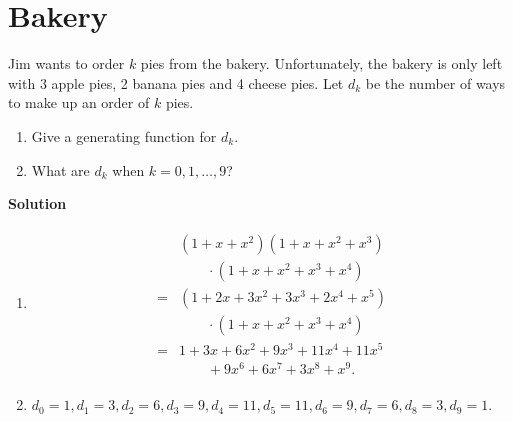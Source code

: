 \documentclass{../../cls/sig-alternate-05-2015}
\begin{document}
\section{Bakery}
Jim wants to order $k$ pies from the bakery.
Unfortunately,
the bakery is only left with 3 apple pies,
2 banana pies and 4 cheese pies.
Let $d_k$ be the number of ways
to make up an order of $k$ pies.
\begin{enumerate}
    \item Give a generating function for $d_k$.
    \item What are $d_k$ when $k = 0, 1, \ldots, 9$?
\end{enumerate}
\textbf{Solution} \begin{enumerate}
    \item \begin{align}
    \begin{aligned}
    & (1 + x + x^2)(1 + x + x^2 + x^3)\\
    & \qquad \cdot (1 + x + x^2 + x^3 + x^4)\\
    = & (1 + 2x + 3x^2 + 3x^3 + 2x^4 + x^5)\\
    & \qquad \cdot (1 + x + x^2 + x^3 + x^4)\\
    = & 1 + 3x + 6x^2 + 9x^3 + 11x^4 + 11x^5\\
    & \qquad + 9x^6 + 6x^7 + 3x^8 + x^9.
    \end{aligned}
    \end{align}
    \item $d_0 = 1, d_1 = 3, d_2 = 6, d_3 = 9, d_4 = 11, d_5 = 11, d_6 = 9, d_7 = 6, d_8 = 3, d_9 = 1$.
\end{enumerate}
\end{document}
